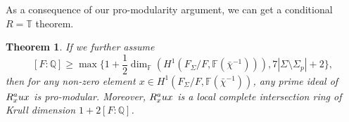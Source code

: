 \documentclass[12pt]{amsart}
\theoremstyle{plain}
\newtheorem{thm}{Theorem}[subsection]
\theoremstyle{definition}
\theoremstyle{remark}
\begin{document}
As a consequence of our pro-modularity argument, we can get a conditional $R=\mathbb{T}$ theorem.

\begin{thm}\label{MINIMAL}
	 If we further assume $$[F:\mathbb{Q}] \ge \operatorname{max}\{1+\frac{1}{2}\operatorname{dim}_{\mathbb{F}}(H^1(F_{\Sigma}/F, \mathbb{F}(\bar{\chi}^{-1}))), 7|\Sigma \setminus \Sigma_p|+2\},$$ 
	then for any non-zero element $x \in H^1(F_{\Sigma}/F, \mathbb{F}(\bar{\chi}^{-1}))$, any prime ideal of $ R_x^\textnormal{aux}$ is pro-modular. Moreover, $ R_x^\textnormal{aux}$ is a local complete intersection ring of Krull dimension $1+2[F:\mathbb{Q}] $.
	
\end{thm}
\end{document}
